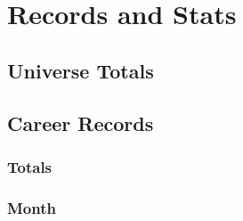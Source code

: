 \part{Records and Stats}
  \chapter{Universe Totals}
  \chapter{Career Records}
    \section{Totals}
      
      \clearpage
    \section{Month}
      
      \clearpage

